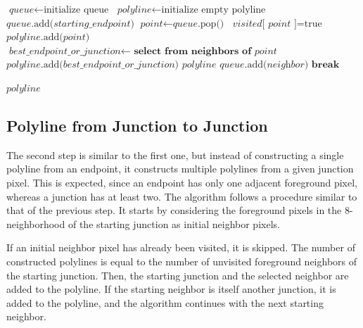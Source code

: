 {
\begin{algorithmic}[1]
	\State $\textit{queue} \gets \text{initialize queue}$
	\State $\textit{polyline} \gets \text{initialize empty polyline}$
	\State
	\State $\textit{queue}\text{.add(}\textit{starting\_endpoint}\text{)}$
		\State $\textit{point} \gets \textit{queue}\text{.pop()}$ 
		\State
		\State $\textit{visited}\text{[}\textit{ point }\text{]} = \text{true}$
		\State $\textit{polyline}\text{.add(}\textit{point}\text{)}$
		\State
		\State $\textit{best\_endpoint\_or\_junction}\gets\textbf{ select from neighbors of }\textit{point}$
			\State $\textit{polyline}\text{.add(}\textit{best\_endpoint\_or\_junction}\text{)}$
			\State
			\Return $\textit{polyline}$
		\EndIf
		\State
				\State $\textit{queue}\text{.add(}\textit{neighbor}\text{)}$
				\State $\textbf{break}$
			\EndIf
		\EndFor
	\EndWhile
	
	\State
	\State
	\Return $\textit{polyline}$
	\EndProcedure
\end{algorithmic}
}


\subsection{Polyline from Junction to Junction}

The second step is similar to the first one, but instead of constructing a single polyline from an endpoint, it constructs multiple polylines from a given junction pixel. This is expected, since an endpoint has only one adjacent foreground pixel, whereas a junction has at least two. The algorithm follows a procedure similar to that of the previous step. It starts by considering the foreground pixels in the 8-neighborhood of the starting junction as initial neighbor pixels.

If an initial neighbor pixel has already been visited, it is skipped. The number of constructed polylines is equal to the number of unvisited foreground neighbors of the starting junction. Then, the starting junction and the selected neighbor are added to the polyline. If the starting neighbor is itself another junction, it is added to the polyline, and the algorithm continues with the next starting neighbor.

